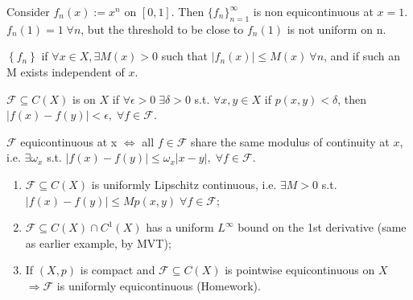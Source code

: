 \begin{exmp}
    Consider $f_n(x) := x^n$ on $[0,1]$. Then $\{f_{n}\}_{n=1}^{\infty} $ is non equicontinuous
    at $x = 1$. $f_n(1) = 1 \; \forall n$, but the threshold to be close to $f_n(1)$ is 
    not uniform on n.
    \begin{marginfigure}
        \centering
        
        \caption{The sequence $f_n(x)=x^n$ is not equicontinuous.}
    \end{marginfigure}
\end{exmp}


\begin{defn}
    $\left\{ f_n \right\}$  if $\forall x \in X, 
    \exists M(x) > 0$ such that $\left| f_n(x) \right| \leq M(x) \ \forall n$, and 
     if such an M exists independent of $x$.    
\end{defn}

\begin{defn}
    $\mathcal{F} \subseteq C(X)$ is  on
    $X$ if $\forall \epsilon > 0 \; \exists \delta > 0$ s.t. $\forall x,y \in X$ if $p(x, y) < \delta$,
    then $\left| f(x) - f(y) \right| < \epsilon, \; \forall f \in \mathcal{F}$.      
\end{defn}

\begin{rem}
    $\mathcal{F} $ equicontinuous at x $\iff$ all $f \in \mathcal{F}$ share the same modulus of 
    continuity at $x$, i.e. $\exists \omega_x$ s.t. $\left| f(x) - f(y) \right| 
    \leq \omega_x \left| x - y \right|,\; \forall f \in \mathcal{F}$.      
\end{rem} 
\begin{prop}
\leavevmode
\begin{enumerate}
    \item $\mathcal{F} \subseteq C(X)$ is uniformly Lipschitz continuous, i.e. $\exists M > 0$
    s.t. $\left| f(x) - f(y) \right| \leq Mp(x, y) \; \forall f \in \mathcal{F}$;
    \item $\mathcal{F} \subseteq C(X) \cap C^1(X)$ has a uniform $L^\infty$ bound on the
    1st derivative (same as earlier example, by MVT);
    \item If $(X, p)$ is compact and $\mathcal{F} \subseteq C(X)$ is pointwise equicontinuous on 
    $X$ $\Rightarrow \mathcal{F}$ is uniformly equicontinuous (Homework).          
\end{enumerate}
\end{prop}


